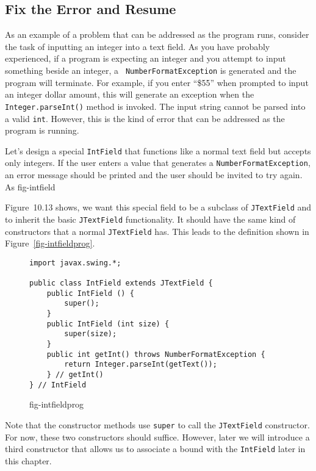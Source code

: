 \subsection{Fix the Error and Resume}
\noindent As an example of a problem that can be addressed as the
program runs, consider the task of inputting an integer into a text
field.  As you have probably experienced, if a program is expecting an
integer and you attempt to input something beside an integer, a {\tt
NumberFormatException} is generated and the program will terminate.
For example, if you enter ``\$55'' when prompted to input an integer
dollar amount, this will generate an exception when the {\tt
Integer.parseInt()} method is invoked.  The input string cannot be
parsed into a valid {\tt int}.  However, this is the kind of error
that can be addressed as the program is running.

Let's design a special {\tt IntField} that functions like a normal
text field but accepts only integers.  If the user enters a value that
generates a {\tt NumberFormatException}, an error message should be
printed and the user should be invited to try again.  As
{fig-intfield}

Figure~10.13 shows, we want this special field to be a subclass of
{\tt JTextField} and to inherit the basic {\tt JTextField}
functionality.  It should have the same kind of constructors that a
normal {\tt JTextField} has.  This leads to the definition shown in
Figure~\ref{fig-intfieldprog}.

\begin{figure}[htb]
\jjjprogstart
\begin{jjjlisting}
\begin{lstlisting}
import javax.swing.*;

public class IntField extends JTextField {
    public IntField () {
        super();
    }
    public IntField (int size) {
        super(size);
    }
    public int getInt() throws NumberFormatException {
        return Integer.parseInt(getText());
    } // getInt()
} // IntField
\end{lstlisting}
\end{jjjlisting}
{fig-intfieldprog}
\end{figure}

Note that the constructor methods use {\tt super} to call the
{\tt JTextField} constructor.  For now, these two constructors should
  suffice.  However, later
we will introduce a third constructor that allows us to associate a
bound with the {\tt IntField} later in this chapter.


